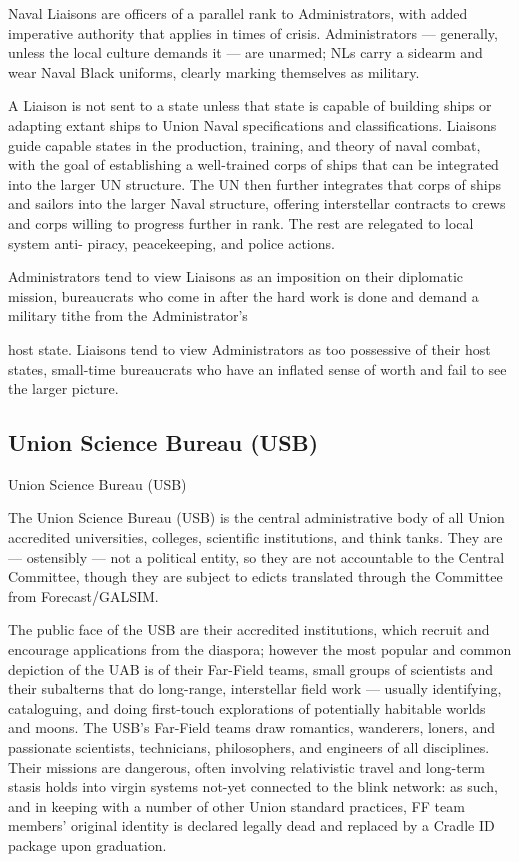 Naval Liaisons are officers of a parallel rank to Administrators, with added imperative authority  
that applies in times of crisis. Administrators — generally, unless the local culture demands it —  
are unarmed; NLs carry a sidearm and wear Naval Black uniforms, clearly marking themselves as  
military. 
 

A Liaison is not sent to a state unless that state is capable of building ships or adapting extant  
ships to Union Naval specifications and classifications. Liaisons guide capable states in the  
production, training, and theory of naval combat, with the goal of establishing a well-trained  
corps of ships that can be integrated into the larger UN structure. The UN then further integrates  
that corps of ships and sailors into the larger Naval structure, offering interstellar contracts to  
crews and corps willing to progress further in rank. The rest are relegated to local system anti- 
piracy, peacekeeping, and police actions. 
 

Administrators tend to view Liaisons as an imposition on their diplomatic mission, bureaucrats  
who come in after the hard work is done and demand a military tithe from the Administrator’s  

                                                                                                                   


host state. Liaisons tend to view Administrators as too possessive of their host states, small-time  
bureaucrats who have an inflated sense of worth and fail to see the larger picture. 
 
 
\subsection{Union Science Bureau (USB)}

Union Science Bureau (USB)  

The Union Science Bureau (USB) is the central administrative body of all Union accredited  
universities, colleges, scientific institutions, and think tanks. They are — ostensibly — not a  
political entity, so they are not accountable to the Central Committee, though they are subject to  
edicts translated through the Committee from Forecast/GALSIM. 
 

The public face of the USB are their accredited institutions, which recruit and encourage  
applications from the diaspora; however the most popular and common depiction of the UAB is  
of their Far-Field teams, small groups of scientists and their subalterns that do long-range,  
interstellar field work — usually identifying, cataloguing, and doing first-touch explorations of  
potentially habitable worlds and moons. The USB’s Far-Field teams draw romantics, wanderers,  
loners, and passionate scientists, technicians, philosophers, and engineers of all disciplines.  
Their missions are dangerous, often involving relativistic travel and long-term stasis holds into  
virgin systems not-yet connected to the blink network: as such, and in keeping with a number of  
other Union standard practices, FF team members’ original identity is declared legally dead and  
replaced by a Cradle ID package upon graduation. 
 

